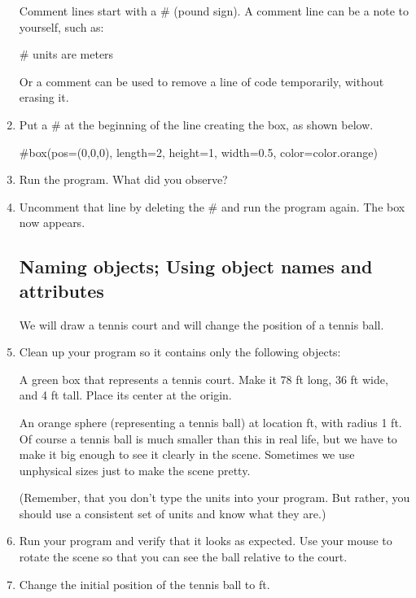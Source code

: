 \begin{enumerate}
Comment lines start with a \# (pound sign). 
A comment line can be a note to yourself, such as:

\begin{myvpython}
# units are meters
\end{myvpython}

Or a comment can be used to remove a line of code temporarily, without erasing it.

	\item Put a \# at the beginning of the line creating the box, as shown below.

\begin{myvpython}
#box(pos=(0,0,0), length=2, height=1, width=0.5, color=color.orange)
\end{myvpython}

	\item Run the program. What did you observe?
	
	\item Uncomment that line by deleting the \# and run the program again. The box now appears.
	
	\subsection*{Naming objects; Using object names and attributes}
	
We will draw a tennis court and will change the position of a tennis ball.

	\item Clean up your program so it contains only the following objects:  

A green box that represents a tennis court. Make it 78 ft long, 36 ft wide, and 4 ft tall. Place its center at the origin.

An orange sphere (representing a tennis ball) at location  ft, with radius 1 ft. Of course a tennis ball is much smaller than this in real life, but we have to make it big enough to see it clearly in the scene. Sometimes we use unphysical sizes just to make the scene pretty.

(Remember, that you don't type the units into your program. But rather, you should use a consistent set of units and know what they are.)

	\item Run your program and verify that it looks as expected. Use your mouse to rotate the scene so that you can see the ball relative to the court. 

	\item Change the initial position of the tennis ball to  ft. 


\end{enumerate}

